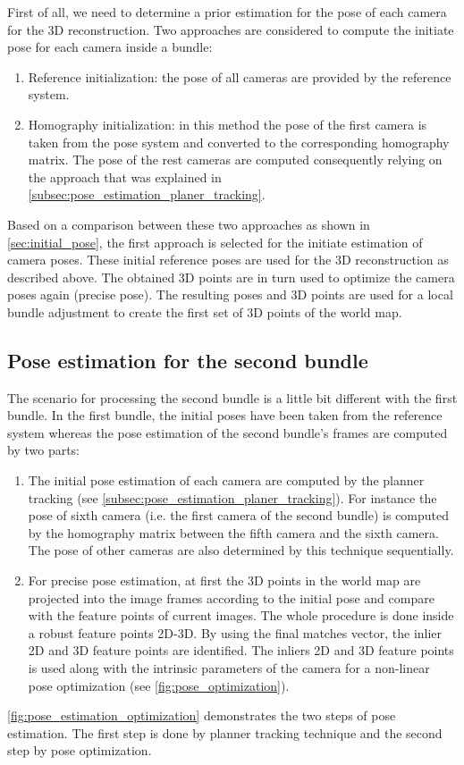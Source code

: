 First of all, we need to determine a prior estimation for the pose of each camera for the 3D reconstruction. Two approaches are considered to compute the initiate pose for each camera inside a bundle:
\begin{enumerate}
\item Reference initialization: the pose of all cameras are provided by the reference system.
\item Homography initialization: in this method the pose of the first camera is taken from the pose system and converted to the corresponding homography matrix. The pose of the rest cameras are computed consequently relying on the approach that was explained in \autoref{subsec:pose_estimation_planer_tracking}.
\end{enumerate}
Based on a comparison between these two approaches as shown in \autoref{sec:initial_pose}, the first approach is selected for the initiate estimation of camera poses. These initial reference poses are used for the 3D reconstruction as described above. The obtained 3D points are in turn used to optimize the camera poses again (precise pose). The resulting poses and 3D points are used for a local bundle adjustment to create the first set of 3D points of the world map. 


\subsection{Pose estimation for the second bundle} \label{subsec:pose_second_bundle}
The scenario for processing the second bundle is a little bit different with the first bundle. In the first bundle, the initial poses have been taken from the reference system whereas the pose estimation of the second bundle's frames are computed by two parts:
\begin{enumerate}
\item The initial pose estimation of each camera are computed by the planner tracking (see \autoref{subsec:pose_estimation_planer_tracking}). For instance the pose of sixth camera (i.e. the first camera of the second bundle) is computed by the homography matrix between the fifth camera and the sixth camera. The pose of other cameras are also determined by this technique sequentially. 
\item For precise pose estimation, at first the 3D points in the world map are projected into the image frames according to the initial pose and compare with the feature points of current images. The whole procedure is done inside a robust feature points 2D-3D. By using the final matches vector, the inlier 2D and 3D feature points are identified. The inliers 2D and 3D feature points is used along with the intrinsic parameters of the camera for a non-linear pose optimization (see \autoref{fig:pose_optimization}).
 
\end{enumerate}
\autoref{fig:pose_estimation_optimization} demonstrates the two steps of pose estimation. The first step is done by planner tracking technique and the second step by pose optimization.

